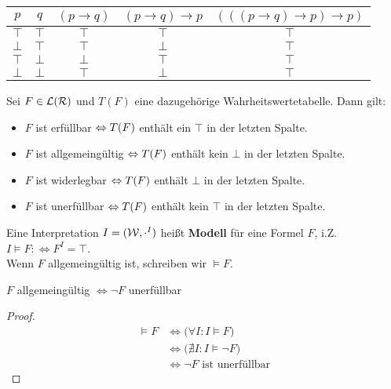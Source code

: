 \begin{beispiel}\enter
	\begin{tabular}{c|c||c|c|c}
		$p$ & $q$ & $(p\to q)$ & $(p\to q)\to p$ & $(((p\to q)\to p)\to p)$\\ \hline
		$\top$ & $\top$ & $\top$ & $\top$ & $\top$ \\
		$\bot$ & $\top$ & $\top$ & $\bot$ & $\top$ \\
		$\top$ & $\bot$ & $\bot$ & $\top$ & $\top$\\
		$\bot$ & $\bot$ & $\top$ & $\bot$ & $\top$
	\end{tabular}
\end{beispiel}

\begin{bemerkung}
	Sei $F\in\mathcal{L}(\mathcal{R})$ und $T(F)$ eine dazugehörige Wahrheitswertetabelle.
	Dann gilt:
	\begin{itemize}
		\item $F$ ist erfüllbar $\Leftrightarrow T(F)$ enthält ein $\top$ in der letzten Spalte.
		\item $F$ ist allgemeingültig $\Leftrightarrow T(F)$ enthält kein $\bot$ in der letzten Spalte.
		\item $F$ ist widerlegbar $\Leftrightarrow T(F)$ enthält $\bot$ in der letzten Spalte.
		\item $F$ ist unerfüllbar $\Leftrightarrow T(F)$ enthält kein $\top$ in der letzten Spalte.
	\end{itemize}
\end{bemerkung}

\begin{definition}
	Eine Interpretation $I=(\mathcal{W},\cdot^I)$ heißt \textbf{Modell} für eine Formel $F$, i.Z. $I\models F:\Longleftrightarrow F^I=\top$.\\
	Wenn $F$ allgemeingültig ist, schreiben wir $\models F$.
\end{definition}

\begin{satz}\label{satz3.14}
	$F$ allgemeingültig $\Longleftrightarrow\neg F$ unerfüllbar
\end{satz}

\begin{proof}
	\begin{align*}
		\models F &\Longleftrightarrow\big(\forall I:I\models F\big)\\
		&\Longleftrightarrow\big(\nexists I:I\models\neg F\big)\\
		&\Longleftrightarrow\neg F\text{ ist unerfüllbar}
	\end{align*}
\end{proof}

